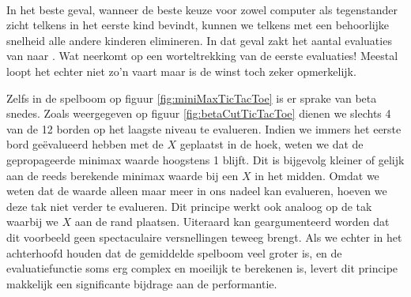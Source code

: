 \paragraph{}
In het beste geval, wanneer de beste keuze voor zowel computer als tegenstander zicht telkens in het eerste kind bevindt, kunnen we telkens met een behoorlijke snelheid alle andere kinderen elimineren. In dat geval zakt het aantal evaluaties van  naar . Wat neerkomt op een worteltrekking van de eerste evaluaties! Meestal loopt het echter niet zo'n vaart maar is de winst toch zeker opmerkelijk.
\begin{leftbar}
Zelfs in de spelboom op figuur \ref{fig:miniMaxTicTacToe} is er sprake van beta snedes. Zoals weergegeven op figuur \ref{fig:betaCutTicTacToe} dienen we slechts 4 van de 12 borden op het laagste niveau te evalueren. Indien we immers het eerste bord geëvalueerd hebben met de $X$ geplaatst in de hoek, weten we dat de gepropageerde minimax waarde hoogstens 1 blijft. Dit is bijgevolg kleiner of gelijk aan de reeds berekende minimax waarde bij een $X$ in het midden. Omdat we weten dat de waarde alleen maar meer in ons nadeel kan evalueren, hoeven we deze tak niet verder te evalueren. Dit principe werkt ook analoog op de tak waarbij we $X$ aan de rand plaatsen. Uiteraard kan geargumenteerd worden dat dit voorbeeld geen spectaculaire versnellingen teweeg brengt. Als we echter in het achterhoofd houden dat de gemiddelde spelboom veel groter is, en de evaluatiefunctie soms erg complex en moeilijk te berekenen is, levert dit principe makkelijk een significante bijdrage aan de performantie.
\end{leftbar}
